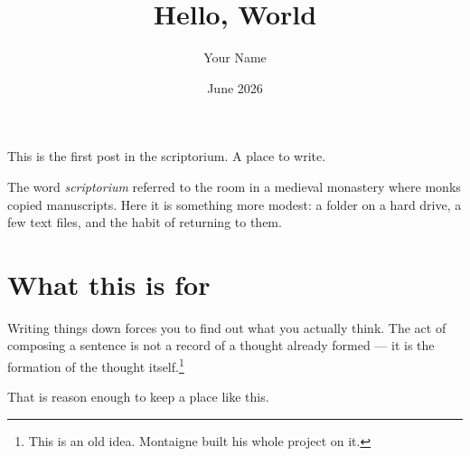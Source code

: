 \documentclass[12pt]{article}
\title{Hello, World}
\author{Your Name}
\date{June 2026}
\begin{document}
\maketitle

This is the first post in the scriptorium. A place to write.

The word \textit{scriptorium} referred to the room in a medieval monastery where
monks copied manuscripts. Here it is something more modest: a folder on a hard
drive, a few text files, and the habit of returning to them.

\section*{What this is for}

Writing things down forces you to find out what you actually think. The act of
composing a sentence is not a record of a thought already formed — it is the
formation of the thought itself.\footnote{This is an old idea. Montaigne built
his whole project on it.}

That is reason enough to keep a place like this.
\end{document}
